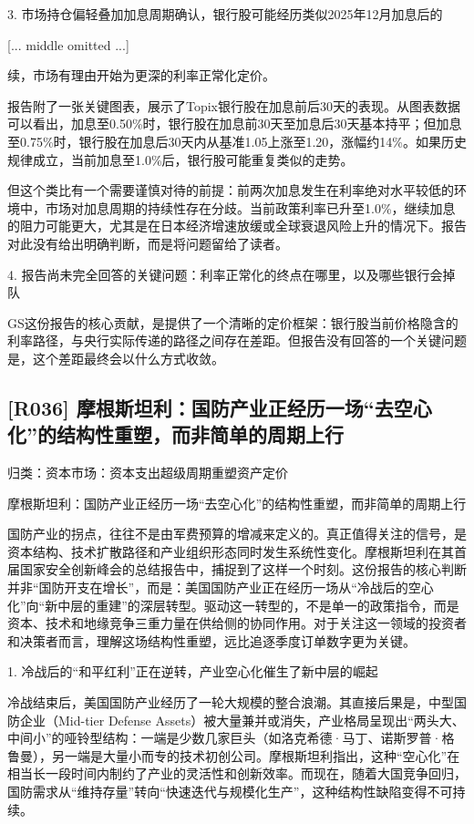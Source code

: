 \documentclass[11pt]{ctexart}
\begin{document}
3. 市场持仓偏轻叠加加息周期确认，银行股可能经历类似2025年12月加息后的

[... middle omitted ...]

续，市场有理由开始为更深的利率正常化定价。

报告附了一张关键图表，展示了Topix银行股在加息前后30天的表现。从图表数据可以看出，加息至0.50\%时，银行股在加息前30天至加息后30天基本持平；但加息至0.75\%时，银行股在加息后30天内从基准1.05上涨至1.20，涨幅约14\%。如果历史规律成立，当前加息至1.0\%后，银行股可能重复类似的走势。

但这个类比有一个需要谨慎对待的前提：前两次加息发生在利率绝对水平较低的环境中，市场对加息周期的持续性存在分歧。当前政策利率已升至1.0\%，继续加息的阻力可能更大，尤其是在日本经济增速放缓或全球衰退风险上升的情况下。报告对此没有给出明确判断，而是将问题留给了读者。

4. 报告尚未完全回答的关键问题：利率正常化的终点在哪里，以及哪些银行会掉队

GS这份报告的核心贡献，是提供了一个清晰的定价框架：银行股当前价格隐含的利率路径，与央行实际传递的路径之间存在差距。但报告没有回答的一个关键问题是，这个差距最终会以什么方式收敛。

\subsection{[R036] 摩根斯坦利：国防产业正经历一场“去空心化”的结构性重塑，而非简单的周期上行}
{\small\color{refgray}归类：资本市场：资本支出超级周期重塑资产定价}

摩根斯坦利：国防产业正经历一场“去空心化”的结构性重塑，而非简单的周期上行

国防产业的拐点，往往不是由军费预算的增减来定义的。真正值得关注的信号，是资本结构、技术扩散路径和产业组织形态同时发生系统性变化。摩根斯坦利在其首届国家安全创新峰会的总结报告中，捕捉到了这样一个时刻。这份报告的核心判断并非“国防开支在增长”，而是：美国国防产业正在经历一场从“冷战后的空心化”向“新中层的重建”的深层转型。驱动这一转型的，不是单一的政策指令，而是资本、技术和地缘竞争三重力量在供给侧的协同作用。对于关注这一领域的投资者和决策者而言，理解这场结构性重塑，远比追逐季度订单数字更为关键。

1. 冷战后的“和平红利”正在逆转，产业空心化催生了新中层的崛起

冷战结束后，美国国防产业经历了一轮大规模的整合浪潮。其直接后果是，中型国防企业（Mid-tier Defense Assets）被大量兼并或消失，产业格局呈现出“两头大、中间小”的哑铃型结构：一端是少数几家巨头（如洛克希德·马丁、诺斯罗普·格鲁曼），另一端是大量小而专的技术初创公司。摩根斯坦利指出，这种“空心化”在相当长一段时间内制约了产业的灵活性和创新效率。而现在，随着大国竞争回归，国防需求从“维持存量”转向“快速迭代与规模化生产”，这种结构性缺陷变得不可持续。
\end{document}
